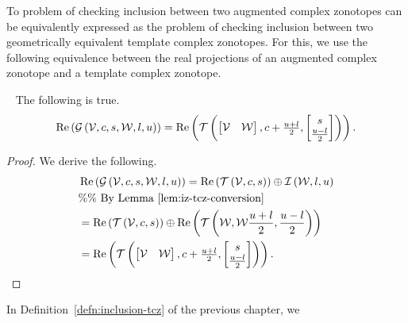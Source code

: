 %
To problem of checking inclusion between two augmented complex
zonotopes can be equivalently expressed as the problem of checking
inclusion between two geometrically equivalent template complex
zonotopes.  For this, we use the following equivalence between the
real projections of an augmented complex zonotope and a template
complex zonotope.
%
\begin{lemma}~\label{lem:acz-tcz-conversion}
The following is true.
%
\begin{align*}
  \operatorname{Re}\left(\mathcal{G}\left(\mathcal{V},c,s,\mathcal{W},l,u\right)\right)
  = \operatorname{Re}\left(\mathit{\operatorname{\mathcal{T}}}\left(\left[\begin{matrix}
      \mathcal{V} &
      \mathcal{W}
    \end{matrix}\right]
  ,\begin{matrix}
      c+\frac{u+l}{2}
    \end{matrix}
  ,\left[\begin{matrix}
      s\\
      \frac{u-l}{2}
    \end{matrix}\right]
  \right)
  \right).
\end{align*}
%
\end{lemma}
%
\begin{proof}
  We derive the following.
  \begin{align*}
    & \operatorname{Re}\left(\mathcal{G}\left(\mathcal{V},c,s,\mathcal{W},l,u\right)\right)
    =
    \operatorname{Re}\left(\mathit{\operatorname{\mathcal{T}}}\left(\mathcal{V},c,s\right)\right)\oplus\mathit{\operatorname{\mathcal{I}}}\left(\mathcal{W},l,u\right)\\
    & \%\%~\text{By Lemma~\ref{lem:iz-tcz-conversion}}\\
    & =
    \operatorname{Re}\left(\mathit{\operatorname{\mathcal{T}}}\left(\mathcal{V},c,s\right)\right)\oplus\operatorname{Re}\left(\mathit{\operatorname{\mathcal{T}}}\left(\mathcal{W},\mathcal{W}\frac{u+l}{2},\frac{u-l}{2}\right)\right)\\
    &
  = \operatorname{Re}\left(\mathit{\operatorname{\mathcal{T}}}\left(\left[\begin{matrix}
      \mathcal{V} &
      \mathcal{W}
    \end{matrix}\right]
  ,\begin{matrix}
      c+\frac{u+l}{2}
    \end{matrix}
  ,\left[\begin{matrix}
      s\\
      \frac{u-l}{2}
    \end{matrix}\right]
  \right)
  \right).\hspace{4em}\qedhere
   \end{align*}
\end{proof}
%
 In Definition~\ref{defn:inclusion-tcz} of the previous chapter, we
